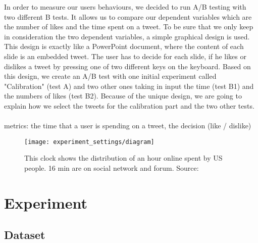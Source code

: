 In order to measure our users behaviours, we decided to run A/B testing with two different B tests. It allows us 
to compare our dependent variables which are the number of likes and the time spent on a tweet. To be sure 
that we only keep in consideration the two dependent variables, a simple graphical design is used. This 
design is exactly like a PowerPoint document, where the content of each slide is an embedded tweet. The 
user has to decide for each slide, if he likes or dislikes a tweet by pressing one of two different keys on the 
keyboard. Based on this design, we create an A/B test with one initial experiment called "Calibration" (test A) 
and two other ones taking in input the time (test B1) and the numbers of likes (test B2). Because of the unique 
design, we are going to explain how we select the tweets for the calibration part and the two other tests. \\
\\
metrics: the time that a user is spending on a tweet, the decision (like / dislike) 

\begin{figure}[h] 
\centering 
\texttt{[image: experiment\_settings/diagram]} 
\caption[Time spent of Social Media]{This clock shows the distribution of an hour online spent by US people. 16 min are on social network and forum. Source: \cite{s_clock}}
\label{fig:clock1} 
\end{figure}

\section{Experiment}

\subsection{Dataset}

